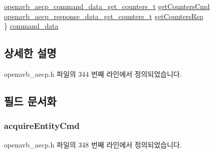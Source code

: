 \begin{DoxyCompactItemize}
\begin{tabbing}
\>\hyperlink{structopenavb__aecp__command__data__get__counters__t}{openavb\_aecp\_command\_data\_get\_counters\_t} \hyperlink{structopenavb__aecp__entity__model__data__unit__t_a618ab6503cd3d29ce3b39f8bcb09ade5}{getCountersCmd}\\
\>\hyperlink{structopenavb__aecp__response__data__get__counters__t}{openavb\_aecp\_response\_data\_get\_counters\_t} \hyperlink{structopenavb__aecp__entity__model__data__unit__t_ab562c372f91c79a9fd6c4e321324b142}{getCountersRsp}\\
\} \hyperlink{structopenavb__aecp__entity__model__data__unit__t_add21940869ac3d681807b8c2f348c449}{command\_data}\\

\end{tabbing}\end{DoxyCompactItemize}


\subsection{상세한 설명}


openavb\+\_\+aecp.\+h 파일의 344 번째 라인에서 정의되었습니다.



\subsection{필드 문서화}
\subsubsection[{\texorpdfstring{acquire\+Entity\+Cmd}{acquireEntityCmd}}]{ acquire\+Entity\+Cmd}\hypertarget{structopenavb__aecp__entity__model__data__unit__t_ace615330bf6f576e658a2abb6fa98498}{}\label{structopenavb__aecp__entity__model__data__unit__t_ace615330bf6f576e658a2abb6fa98498}


openavb\+\_\+aecp.\+h 파일의 348 번째 라인에서 정의되었습니다.

